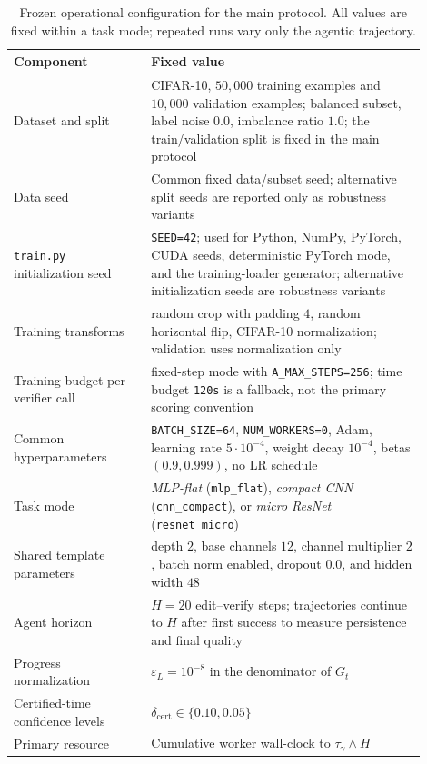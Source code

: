 \documentclass{article}
\newcommand{\eps}{\varepsilon}
\begin{document}
\begin{table}[t]
\centering
\small
\caption{Frozen operational configuration for the main protocol.
All values are fixed within a task mode; repeated runs vary only the agentic trajectory.}
\label{tab:train-config}
\begin{tabular}{@{}p{0.30\linewidth}p{0.60\linewidth}@{}}
\toprule
Component & Fixed value \\
\midrule
Dataset and split & CIFAR-10, $50{,}000$ training examples and $10{,}000$ validation examples; balanced subset, label noise $0.0$, imbalance ratio $1.0$; the train/validation split is fixed in the main protocol \\
Data seed & Common fixed data/subset seed; alternative split seeds are reported only as robustness variants \\
\texttt{train.py} initialization seed & \texttt{SEED=42}; used for Python, NumPy, PyTorch, CUDA seeds, deterministic PyTorch mode, and the training-loader generator; alternative initialization seeds are robustness variants \\
Training transforms & random crop with padding $4$, random horizontal flip, CIFAR-10 normalization; validation uses normalization only \\
Training budget per verifier call & fixed-step mode with \texttt{A\_MAX\_STEPS=256}; time budget \texttt{120s} is a fallback, not the primary scoring convention \\
Common hyperparameters & \texttt{BATCH\_SIZE=64}, \texttt{NUM\_WORKERS=0}, Adam, learning rate $5\cdot 10^{-4}$, weight decay $10^{-4}$, betas $(0.9,0.999)$, no LR schedule \\
Task mode & \textit{MLP-flat} (\texttt{mlp\_flat}), \textit{compact CNN} (\texttt{cnn\_compact}), or \textit{micro ResNet} (\texttt{resnet\_micro}) \\
Shared template parameters & depth $2$, base channels $12$, channel multiplier $2$, batch norm enabled, dropout $0.0$, and hidden width $48$ \\
Agent horizon & \(H=20\) edit--verify steps; trajectories continue to \(H\) after first success to measure persistence and final quality \\
Progress normalization & $\eps_L=10^{-8}$ in the denominator of $G_t$ \\
Certified-time confidence levels & \(\delta_{\mathrm{cert}}\in\{0.10,0.05\}\) \\
Primary resource & Cumulative worker wall-clock to \(\tau_\gamma\wedge H\) \\

\end{tabular}
\end{table}
\end{document}
